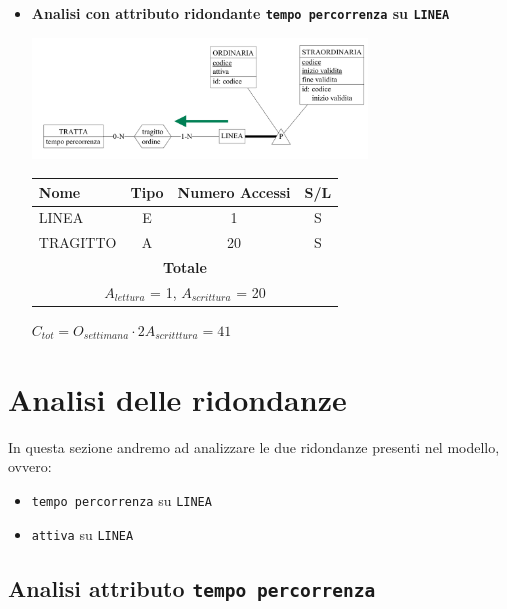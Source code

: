 \documentclass[12pt,a4paper]{report}
\begin{document}
\begin{enumerate}[label=\textbf{\arabic*)}]
\begin{itemize}
	\item \textbf{Analisi con attributo ridondante \texttt{tempo percorrenza} su \texttt{LINEA}}
	\begin{center}
	\includegraphics[width=0.7\textwidth]{InserimentoLineaNoRid}
	\end{center}
	\begin{table}[H]
	\centering
	\begin{tabular}{|l|c|c|c|}
	\hline
	Nome & Tipo & Numero Accessi & S/L \\
	\hline
	LINEA & E & 1 & S \\
	\hline
	TRAGITTO & A & 20 & S \\
	\hline
	    \multicolumn{4}{c}{\textbf{Totale}} \\
	    \multicolumn{4}{c}{${A_{lettura}}$ = 1, ${A_{scrittura}}$ = 20} \\
	    \hline
	    \end{tabular}
	    \end{table}
	    \begin{center}
	    ${C_{tot} = {O_{settimana}}\cdot{2A_{scritttura}}= 41}$
	    \end{center}
	\end{itemize}
\end{enumerate}

\section{Analisi delle ridondanze}
In questa sezione andremo ad analizzare le due ridondanze presenti nel modello, ovvero:
\begin{itemize}
  \item \texttt{tempo percorrenza} su \texttt{LINEA}
  \item \texttt{attiva} su \texttt{LINEA}
\end{itemize}

\subsection{Analisi attributo \texttt{tempo percorrenza}}
\end{document}
